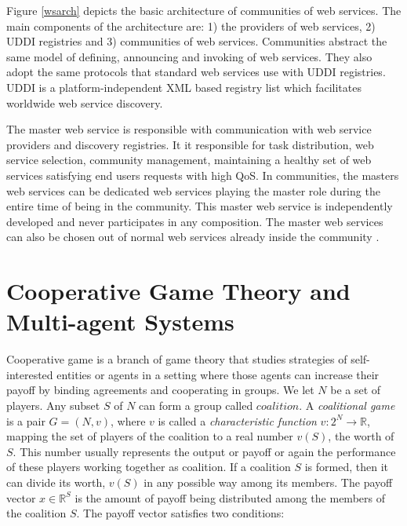         Figure \ref{wsarch} depicts the basic architecture of communities of web services. The main components of the architecture are: 1) the providers of web services,
        2) UDDI registries and 3) communities of web services. Communities abstract the same model of defining, announcing and invoking of web services. They also adopt the same protocols that standard web services use with UDDI registries. UDDI is a platform-independent XML based registry list which facilitates worldwide web service discovery.

        The master web service is responsible with communication with web service providers and discovery registries. It it responsible for task distribution, web service selection,
        community management, maintaining a healthy set of web services satisfying end users requests with high QoS. In communities, the masters web services can be
        dedicated web services playing the master role during the entire time of being in the community. This master web service is independently developed and never
        participates in any composition. The master web services can also be chosen out of normal web services already inside the community \cite{DBLP:journals/ijebr/MaamarSTBB09}.


    \section{Cooperative Game Theory and Multi-agent Systems}\label{sec:CGTMS}



        Cooperative game is a branch of game theory that studies
        strategies of self-interested entities or agents in a setting
        where those agents can increase their payoff by binding agreements
        and cooperating in groups. We let $N$ be a set of players. Any
        subset $S$ of $N$ can form a group called $coalition$. A
        \emph{coalitional game} is a pair $G = (N, v)$, where $v$ is called
        a \emph{characteristic function} $v: 2^N \to \mathbb{R}$, mapping the set of players of the
        coalition to a real number $v(S)$, the worth of $S$. This number
        usually represents the output or payoff or again the performance
        of these players working together as coalition.  If a coalition
        $S$ is formed, then it can divide its worth, $v(S)$ in any
        possible way among its members. The payoff vector $x \in
        \mathbb{R}^S$ is the amount of payoff being distributed among the
        members of the coalition $S$. The payoff vector satisfies two
        conditions:

